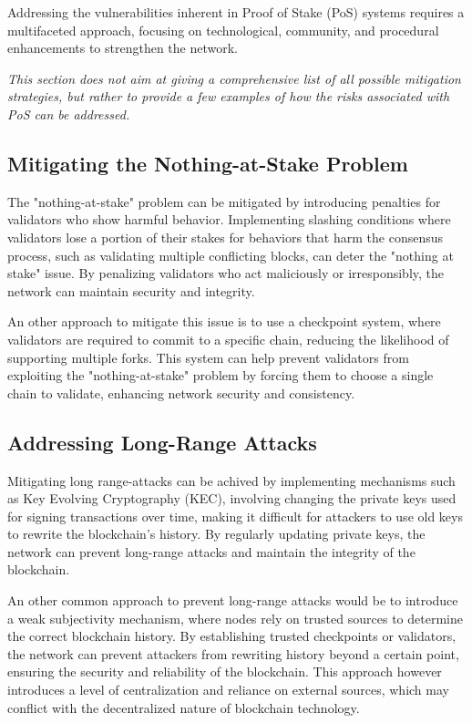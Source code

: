 Addressing the vulnerabilities inherent in Proof of Stake (PoS) systems requires a multifaceted approach, focusing on technological, community, and procedural enhancements to strengthen the network. 

\textit{This section does not aim at giving a comprehensive list of all possible mitigation strategies, but rather to provide a few examples of how the risks associated with PoS can be addressed.}

\subsection{Mitigating the Nothing-at-Stake Problem}

The "nothing-at-stake" problem can be mitigated by introducing penalties for validators who show harmful behavior. Implementing slashing conditions where validators lose a portion of their stakes for behaviors that harm the consensus process, such as validating multiple conflicting blocks, can deter the "nothing at stake" issue. By penalizing validators who act maliciously or irresponsibly, the network can maintain security and integrity.

An other approach to mitigate this issue is to use a checkpoint system, where validators are required to commit to a specific chain, reducing the likelihood of supporting multiple forks. This system can help prevent validators from exploiting the "nothing-at-stake" problem by forcing them to choose a single chain to validate, enhancing network security and consistency.

\subsection{Addressing Long-Range Attacks}

Mitigating long range-attacks can be achived by implementing mechanisms such as Key Evolving Cryptography (KEC), involving changing the private keys used for signing transactions over time, making it difficult for attackers to use old keys to rewrite the blockchain's history. By regularly updating private keys, the network can prevent long-range attacks and maintain the integrity of the blockchain.

An other common approach to prevent long-range attacks would be to introduce a weak subjectivity mechanism, where nodes rely on trusted sources to determine the correct blockchain history. By establishing trusted checkpoints or validators, the network can prevent attackers from rewriting history beyond a certain point, ensuring the security and reliability of the blockchain. This approach however introduces a level of centralization and reliance on external sources, which may conflict with the decentralized nature of blockchain technology.

